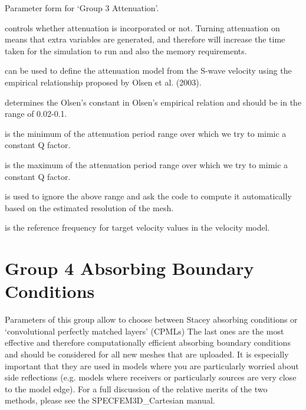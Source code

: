 \documentclass[english]{book}
\begin{document}

 Parameter form for ‘Group 3 \textendash{} Attenuation’.

 controls whether attenuation is incorporated or not.
Turning attenuation on means that extra variables are generated, and
therefore will increase the time taken for the simulation to run and
also the memory requirements.

 can be used to define the attenuation model
from the S-wave velocity using the empirical relationship proposed by
Olsen et al. (2003).

 determines the Olsen’s constant in Olsen’s
empirical relation and should be in the range of 0.02-0.1.

 is the minimum of the attenuation period
range over which we try to mimic a constant Q factor.

 is the maximum of the attenuation period
range over which we try to mimic a constant Q factor.

 is used to ignore the above range and
ask the code to compute it automatically based on the estimated
resolution of the mesh.

 is the reference frequency for target
velocity values in the velocity model.


\section{Group 4 \textendash{} Absorbing Boundary Conditions}
\label{\detokenize{Appendix1:a1-5-group-4-absorbing-boundary-conditions}}
Parameters of this group allow to choose between Stacey absorbing
conditions or ‘convolutional perfectly matched layers’ (CPMLs) The last
ones are the most effective and therefore computationally efficient
absorbing boundary conditions and should be considered for all new
meshes that are uploaded. It is especially important that they are used
in models where you are particularly worried about side reflections
(e.g. models where receivers or particularly sources are very close to
the model edge). For a full discussion of the relative merits of the two
methods, please see the SPECFEM3D\_Cartesian manual.
\end{document}
